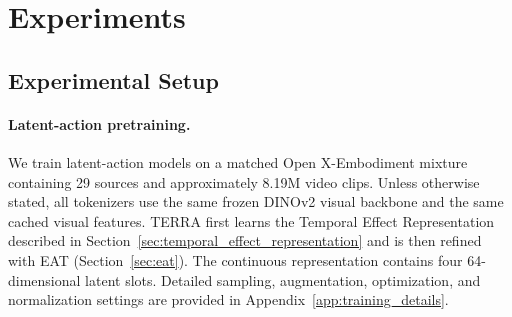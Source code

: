 %

\section{Experiments}
\label{sec:experiments}

\subsection{Experimental Setup}
\label{sec:exp_setup}

\paragraph{Latent-action pretraining.}
We train latent-action models on a matched Open X-Embodiment mixture
containing 29 sources and approximately 8.19M video clips.
Unless otherwise stated, all tokenizers use the same frozen DINOv2 visual
backbone and the same cached visual features.
TERRA first learns the Temporal Effect Representation described in
Section~\ref{sec:temporal_effect_representation} and is then refined with
EAT (Section~\ref{sec:eat}).
The continuous representation contains four 64-dimensional latent slots.
Detailed sampling, augmentation, optimization, and normalization settings
are provided in Appendix~\ref{app:training_details}.

